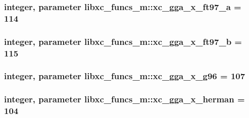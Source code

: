 \hypertarget{classlibxc__funcs__m_a7af33a6856ce6d1e9608936f94409eb5}{
\subsubsection[{xc\-\_\-gga\-\_\-x\-\_\-ft97\-\_\-a}]{\setlength{\rightskip}{0pt plus 5cm}integer, parameter libxc\-\_\-funcs\-\_\-m\-::xc\-\_\-gga\-\_\-x\-\_\-ft97\-\_\-a = 114}}\label{classlibxc__funcs__m_a7af33a6856ce6d1e9608936f94409eb5}
\hypertarget{classlibxc__funcs__m_acfb4c90e58517b9b273a29a7752f07db}{
\subsubsection[{xc\-\_\-gga\-\_\-x\-\_\-ft97\-\_\-b}]{\setlength{\rightskip}{0pt plus 5cm}integer, parameter libxc\-\_\-funcs\-\_\-m\-::xc\-\_\-gga\-\_\-x\-\_\-ft97\-\_\-b = 115}}\label{classlibxc__funcs__m_acfb4c90e58517b9b273a29a7752f07db}
\hypertarget{classlibxc__funcs__m_a09b4f56ddfb4ef5e799be6df6e6ff832}{
\subsubsection[{xc\-\_\-gga\-\_\-x\-\_\-g96}]{\setlength{\rightskip}{0pt plus 5cm}integer, parameter libxc\-\_\-funcs\-\_\-m\-::xc\-\_\-gga\-\_\-x\-\_\-g96 = 107}}\label{classlibxc__funcs__m_a09b4f56ddfb4ef5e799be6df6e6ff832}
\hypertarget{classlibxc__funcs__m_a0bf11a39b781e3559b3f4ba9a47c8b61}{
\subsubsection[{xc\-\_\-gga\-\_\-x\-\_\-herman}]{\setlength{\rightskip}{0pt plus 5cm}integer, parameter libxc\-\_\-funcs\-\_\-m\-::xc\-\_\-gga\-\_\-x\-\_\-herman = 104}}\label{classlibxc__funcs__m_a0bf11a39b781e3559b3f4ba9a47c8b61}
